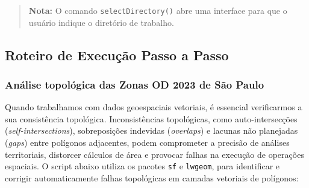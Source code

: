 \documentclass[
  letterpaper,
  DIV=11,
  numbers=noendperiod]{scrreprt}
\begin{document}
\begin{quote}
\textbf{Nota:} O comando \texttt{selectDirectory()} abre uma interface
para que o usuário indique o diretório de trabalho.
\end{quote}

\subsection{\texorpdfstring{\textbf{Roteiro de Execução Passo a
Passo}}{Roteiro de Execução Passo a Passo}}\label{roteiro-de-execuuxe7uxe3o-passo-a-passo-2}

\subsubsection{\texorpdfstring{\textbf{Análise topológica das Zonas OD
2023 de São
Paulo}}{Análise topológica das Zonas OD 2023 de São Paulo}}\label{anuxe1lise-topoluxf3gica-das-zonas-od-2023-de-suxe3o-paulo}

Quando trabalhamos com dados geoespaciais vetoriais, é essencial
verificarmos a sua consistência topológica. Inconsistências topológicas,
como auto-intersecções (\emph{self-intersections}), sobreposições
indevidas (\emph{overlaps}) e lacunas não planejadas (\emph{gaps}) entre
polígonos adjacentes, podem comprometer a precisão de análises
territoriais, distorcer cálculos de área e provocar falhas na execução
de operações espaciais. O script abaixo utiliza os pacotes \texttt{sf} e
\texttt{lwgeom}, para identificar e corrigir automaticamente falhas
topológicas em camadas vetoriais de polígonos:
\end{document}

